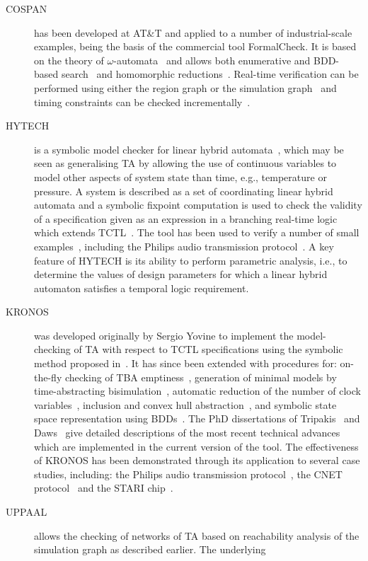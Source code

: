 {\begin{description}
\item[COSPAN] has been developed at AT\&T and applied
to a number of industrial-scale examples, being the basis of the
commercial tool {\sf FormalCheck}. It is based on the theory of
$\omega$-automata~\cite{kur:94} and allows both enumerative and BDD-based
search~\cite{tbk:95} and homomorphic reductions~\cite{tak:96}. Real-time
verification can be performed using either the region graph or the
simulation graph~\cite{ak:95} and timing constraints can be checked
incrementally~\cite{aik:95}.
\item[HYTECH] is a symbolic model checker for linear hybrid 
automata~\cite{hhw:97}, which may be seen as generalising TA by
allowing the use of continuous variables to model other aspects of
system state than time, e.g., temperature or pressure. A system is
described as a set of coordinating linear hybrid automata and a
symbolic fixpoint computation is used to check the validity of a
specification given as an expression in a branching real-time logic
which extends TCTL~\cite{ach:95}. The tool has been used to verify a
number of small examples~\cite{ahh:96}, including the Philips audio
transmission protocol~\cite{hw:95}. A key feature of HYTECH is its
ability to perform parametric analysis, i.e., to determine the values
of design parameters for which a linear hybrid automaton satisfies a
temporal logic requirement.
\item[KRONOS] was developed originally by Sergio Yovine 
to implement the model-checking of TA with respect to TCTL
specifications using the symbolic method proposed
in~\cite{hnsy:94}. It has since been extended with procedures for:
on-the-fly checking of TBA emptiness~\cite{bty:97}, generation of
minimal models by time-abstracting bisimulation~\cite{ty:96},
automatic reduction of the number of clock
variables~\cite{daw:98a,dy:96}, inclusion and convex hull
abstraction~\cite{dt:98}, and symbolic state space representation
using BDDs~\cite{bmp:97}.  The PhD dissertations of
Tripakis~\cite{tri:98} and Daws~\cite{daw:98} give detailed
descriptions of the most recent technical advances which are
implemented in the current version of the tool. The effectiveness of
KRONOS has been demonstrated through its application to several case
studies, including: the Philips audio transmission
protocol~\cite{dy:95}, the CNET protocol~\cite{ty:98} and the STARI
chip~\cite{bmp:97}.
\item[UPPAAL] allows the checking of networks of TA based on reachability
analysis of the simulation graph as described earlier. The underlying

\end{description}}
